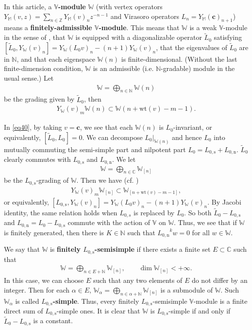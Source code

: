 \documentclass[11pt,b5paper,notitlepage]{article}
\theoremstyle{definition}
\theoremstyle{plain}
\newcommand{\wtd}{\widetilde}
\newcommand{\Vbb}{\mathbb V}
\newcommand{\Wbb}{\mathbb W}
\newcommand{\Mbb}{\mathbb M}
\newcommand{\Cbb}{\mathbb C}
\newcommand{\Nbb}{\mathbb N}
\newcommand{\Zbb}{\mathbb Z}
\newcommand{\cbf}{\mathbf c}
\newcommand{\wt}{\mathrm{wt}}
\newcommand{\Lss}{{L_{0,\mathrm{s}}}}
\newcommand{\Lni}{{L_{0,\mathrm{n}}}}
\numberwithin{equation}{section}
\begin{document}
In this article,  a \textbf{$\Vbb$-module} $\Wbb$ (with vertex operators $Y_\Mbb(v,z)=\sum_{n\in\Zbb}Y_\Mbb(v)_nz^{-n-1}$ and Virasoro operators $L_n=Y_\Mbb(\cbf)_{n+1}$) means a \textbf{finitely-admissible $\Vbb$-module}. This means that $\Wbb$ is a weak $\Vbb$-module in the sense of \cite{DLM97}, that $\Wbb$ is equipped with a diagonalizable operator $\wtd L_0$ satisfying $[\wtd L_0,Y_\Wbb(v)_n]=Y_\Wbb(L_0 v)_n-(n+1)Y_\Wbb(v)_n$, \index{L0@$\wtd L_0$}  that the eigenvalues of $\wtd L_0$ are in $\Nbb$, and that each eigenspace $\Wbb(n)$ is finite-dimensional. (Without the last finite-dimension condition, $\Wbb$ is an admissible (i.e. $\Nbb$-gradable) module in the usual sense.) Let \index{W@$\Wbb(n),\Wbb_{(n)}$}
\begin{align*}
\Wbb=\bigoplus_{n\in\Nbb}\Wbb(n)	
\end{align*}
be the grading given by $\wtd L_0$, then \begin{align}
Y_\Wbb(v)_m\Wbb(n)\subset \Wbb(n+\wt(v)-m-1).\label{eq40}
\end{align}

In \eqref{eq40}, by taking $v=\cbf$, we see that  each $\Wbb(n)$ is $L_0$-invariant, or equivalently, $[\wtd L_0,L_0]=0$. We can decompose $L_0|_{\Wbb(n)}$ and hence $L_0$ into mutually commuting the semi-simple part and nilpotent part $L_0=\Lss+\Lni$.  \index{L0@$\Lss,\Lni$}  $\wtd L_0$ clearly commutes with $\Lss$ and $\Lni$. We let
\begin{align*}
\Wbb=\bigoplus_{n\in\Cbb}\Wbb_{[n]}	
\end{align*}
be the $\Lss$-grading of $\Wbb$. Then we have (cf. \cite[Prop. 2.19]{HLZ14})
\begin{align}
	Y_\Wbb(v)_m\Wbb_{[n]}\subset \Wbb_{[n+\wt(v)-m-1]},
\end{align}
or equivalently, $[\Lss,Y_\Wbb(v)_n]=Y_\Wbb(L_0 v)_n-(n+1)Y_\Wbb(v)_n$. By Jacobi identity, the same relation holds when $L_{0,s}$ is replaced by $L_0$. So both $\wtd L_0-\Lss$ and $\Lni=L_0-\Lss$ commute with the action of $\Vbb$ on $\Wbb$. Thus, we see that if $\Wbb$ is finitely generated, then there is $K\in\Nbb$ such that $\Lni^kw=0$ for all $w\in\Wbb$.

We say that $\Wbb$ is \textbf{finitely $\Lss$-semisimple} if there exists a finite set $E\subset\Cbb$ such that 
\begin{align*}
\Wbb=\bigoplus_{n\in E+\Nbb}\Wbb_{[n]},\qquad \dim\Wbb_{[n]}<+\infty.
\end{align*}
In this case, we can choose $E$ such that any two elements of $E$ do not differ by an integer. Then for each $\alpha\in E$, $\Wbb_\alpha=\bigoplus_{n\in\alpha+\Nbb}\Wbb_{[n]}$ is a submodule of $\Wbb$. Such $\Wbb_\alpha$ is called \textbf{$\Lss$-simple}. Thus, every finitely $\Lss$-semisimple $\Vbb$-module is a finite direct sum of $\Lss$-simple ones. It is clear that $\Wbb$ is $\Lss$-simple if and only if  $\wtd L_0-\Lss$ is a constant.
\end{document}
